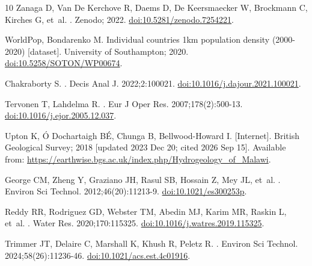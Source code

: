 \documentclass[10pt,letterpaper]{article}
\begin{document}
\begin{thebibliography}{10}
{Zanaga} D, {Van De Kerchove} R, {Daems} D, {De Keersmaecker} W, {Brockmann} C,
  {Kirches} G, et~al.
.
\newblock Zenodo; 2022.
\newblock \href {http://dx.doi.org/10.5281/zenodo.7254221}
  {doi:10.5281/zenodo.7254221}.

{WorldPop}, {Bondarenko} M. {Individual countries 1km population density
  (2000-2020)} [dataset]. University of Southampton; 2020.
\newblock \href {http://dx.doi.org/10.5258/SOTON/WP00674}
  {doi:10.5258/SOTON/WP00674}.

{Chakraborty} S.
.
\newblock Decis Anal J. 2022;2:100021.
\newblock \href {http://dx.doi.org/10.1016/j.dajour.2021.100021}
  {doi:10.1016/j.dajour.2021.100021}.

{Tervonen} T, {Lahdelma} R.
.
\newblock Eur J Oper Res. 2007;178(2):500-13.
\newblock \href {http://dx.doi.org/10.1016/j.ejor.2005.12.037}
  {doi:10.1016/j.ejor.2005.12.037}.

{Upton} K, {{\'O} Dochartaigh} B{\'E}, {Chunga} B, {Bellwood-Howard} I.
 [Internet].
  British Geological Survey; 2018 [updated 2023 Dec 20; cited 2026 Sep 15].
\newblock Available from:
  \url{https://earthwise.bgs.ac.uk/index.php/Hydrogeology_of_Malawi}.

{George} CM, {Zheng} Y, {Graziano} JH, {Rasul} SB, {Hossain} Z, {Mey} JL,
  et~al.
.
\newblock Environ Sci Technol. 2012;46(20):11213-9.
\newblock \href {http://dx.doi.org/10.1021/es300253p} {doi:10.1021/es300253p}.

{Reddy} RR, {Rodriguez} GD, {Webster} TM, {Abedin} MJ, {Karim} MR, {Raskin} L,
  et~al.
.
\newblock Water Res. 2020;170:115325.
\newblock \href {http://dx.doi.org/10.1016/j.watres.2019.115325}
  {doi:10.1016/j.watres.2019.115325}.

{Trimmer} JT, {Delaire} C, {Marshall} K, {Khush} R, {Peletz} R.
.
\newblock Environ Sci Technol. 2024;58(26):11236-46.
\newblock \href {http://dx.doi.org/10.1021/acs.est.4c01916}
  {doi:10.1021/acs.est.4c01916}.


\end{thebibliography}
\end{document}
